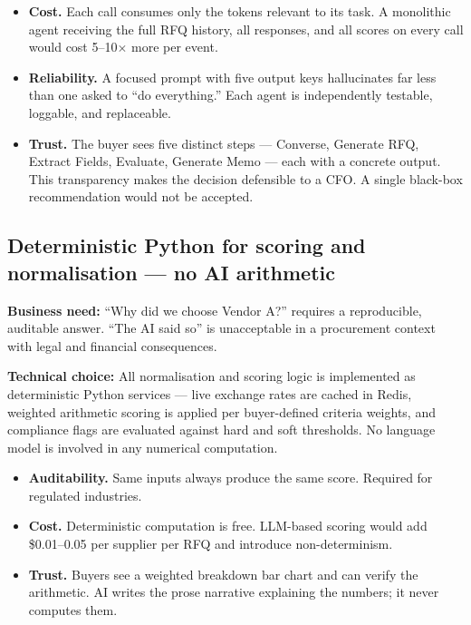 \documentclass[11pt, a4paper]{article}
\begin{document}
\begin{itemize}
  \item \textbf{Cost.} Each call consumes only the tokens relevant to its task.
    A monolithic agent receiving the full RFQ history, all responses, and all
    scores on every call would cost 5--10$\times$ more per event.
  \item \textbf{Reliability.} A focused prompt with five output keys hallucinates
    far less than one asked to ``do everything.'' Each agent is independently
    testable, loggable, and replaceable.
  \item \textbf{Trust.} The buyer sees five distinct steps --- Converse, Generate
    RFQ, Extract Fields, Evaluate, Generate Memo --- each with a concrete output.
    This transparency makes the decision defensible to a CFO. A single black-box
    recommendation would not be accepted.
\end{itemize}

\subsection{Deterministic Python for scoring and normalisation --- no AI arithmetic}

\textbf{Business need:} ``Why did we choose Vendor A?'' requires a reproducible,
auditable answer. ``The AI said so'' is unacceptable in a procurement context
with legal and financial consequences.

\textbf{Technical choice:} All normalisation and scoring logic is implemented as
deterministic Python services --- live exchange rates are cached in Redis,
weighted arithmetic scoring is applied per buyer-defined criteria weights, and
compliance flags are evaluated against hard and soft thresholds. No language
model is involved in any numerical computation.

\begin{itemize}
  \item \textbf{Auditability.} Same inputs always produce the same score.
    Required for regulated industries.
  \item \textbf{Cost.} Deterministic computation is free. LLM-based scoring
    would add \$0.01--0.05 per supplier per RFQ and introduce non-determinism.
  \item \textbf{Trust.} Buyers see a weighted breakdown bar chart and can verify
    the arithmetic. AI writes the prose narrative explaining the numbers; it
    never computes them.
\end{itemize}
\end{document}

